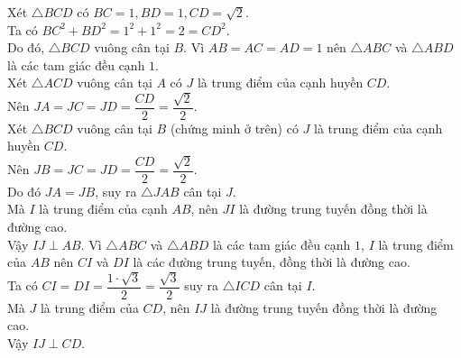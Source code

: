 \begin{ex}
{\begin{itemchoice}
			Xét $\triangle BCD$ có $BC=1, BD=1, CD=\sqrt{2}$. \\ 
			Ta có  $BC^2+BD^2=1^2+1^2=2=CD^2$. \\
			Do đó, $\triangle BCD$  vuông cân tại $B$.
			\itemch Vì $AB=AC=AD=1$ nên  $\triangle ABC$ và $\triangle ABD$ là các tam giác đều cạnh $1$.\\
			Xét $\triangle ACD$ vuông cân tại $A$ có $J$ là trung  điểm của cạnh huyền $CD$.\\
			 Nên $JA=JC=JD=\dfrac{CD}{2}=\dfrac{\sqrt{2}}{2}$.\\
			Xét $\triangle BCD$ vuông cân tại $B$ (chứng minh ở trên) có $J$ là trung điểm của cạnh  huyền $CD$.\\
			 Nên $JB=JC=JD=\dfrac{CD}{2}=\dfrac{\sqrt{2}}{2}$.\\
			Do đó $JA=JB$, suy ra $\triangle JAB$  cân tại $J$. \\
			Mà $I$ là trung điểm của  cạnh $AB$, nên $JI$ là đường trung tuyến đồng thời là đường cao. \\
			Vậy  $IJ \perp AB$.
			\itemch Vì $\triangle ABC$ và  $\triangle ABD$ là các tam giác đều cạnh $1$, $I$ là trung điểm của $AB$ nên $CI$ và $DI$ là các đường trung tuyến, đồng thời là đường cao. \\
			Ta có $CI=DI=\dfrac{1\cdot\sqrt{3}}{2}=\dfrac{\sqrt{3}}{2}$ suy ra  $\triangle ICD$ cân tại $I$. \\
			Mà $J$ là trung điểm của $CD$,  nên $IJ$ là đường trung tuyến đồng thời là đường cao. \\
			Vậy  $IJ \perp CD$.
		\end{itemchoice}
	} 
\end{ex}

